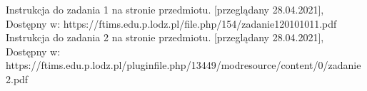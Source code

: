 \documentclass[12pt]{article}
\begin{document}
\begin{thebibliography}{}
 Instrukcja do zadania 1 na stronie przedmiotu. [przeglądany 28.04.2021], Dostępny w: https://ftims.edu.p.lodz.pl/file.php/154/zadanie120101011.pdf
 Instrukcja do zadania 2 na stronie przedmiotu. [przeglądany 28.04.2021], Dostępny w: {https://ftims.edu.p.lodz.pl/pluginfile.php/13449/modresource/content/0/zadanie2.pdf}

\end{thebibliography}
\end{document}
